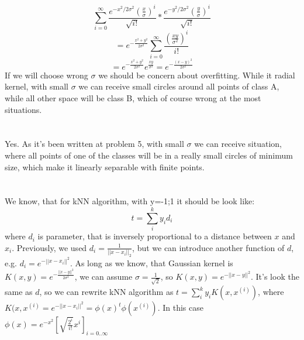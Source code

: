\documentclass[11pt]{article}
\newcommand{\exercise}{\section{}}
\begin{document}
\exercise
$$\sum_{i=0}^{\infty}\frac{e^{-x^2/2\sigma^2}(\frac{x}{\sigma})^i}{\sqrt{i!}}*\frac{e^{-y^2/2\sigma^2}(\frac{y}{\sigma})^i}{\sqrt{i!}}$$
$$=e^{-\frac{x^2+y^2}{2\sigma^2}}\sum_{i=0}^{\infty}\frac{(\frac{xy}{\sigma^2})^i}{i!}$$
$$=e^{-\frac{x^2+y^2}{2\sigma^2}}e^{\frac{xy}{\sigma^2}}=e^{-\frac{(x-y)^2}{2\sigma^2}}$$
If we will choose wrong $\sigma$ we should be concern about overfitting. While it radial kernel, with small $\sigma$ we can receive small circles around all points of class A, while all other space will  be class B, which of course wrong at the most situations.
\exercise
Yes. As it's been written at problem 5, with small $\sigma$ we can receive situation, where all points of one of the classes will be in a really small circles of minimum size, which make it linearly separable with finite points.
\exercise
We know, that for kNN algorithm, with y={-1;1} it should be look like:
$$t=\sum^k_iy_id_i$$
where $d_i$ is parameter, that is inversely proportional  to a distance between $x$ and $x_i$. Previously, we used $d_i=\frac{1}{||x-x_i||_2}$, but we can introduce another function of $d$, e.g. $d_i=e^{-||x-x_i||^2}$.\newline
As long as we know, that Gaussian kernel is $K(x,y)=e^{-\frac{||x-y||^2}{2\sigma^2}}$, we can assume $\sigma=\frac{1}{\sqrt{2}}$, so $K(x,y)=e^{-||x-y||^2}$. It's look the same as $d$, so we can rewrite kNN algorithm as $t=\sum^k_iy_iK(x,x^{(i)})$, where $K(x,x^{(i)}=e^{-||x-x_i||^2}=\phi(x)^t\phi(x^{(i)})$. In this case $\phi(x)=e^{-x^2}[\sqrt{\frac{2^i}{i!}}x^i]_{i=0..\infty}$
\end{document}
